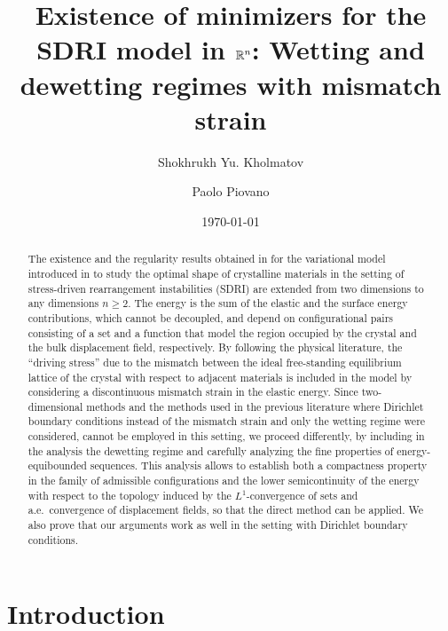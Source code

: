 \documentclass[reqno]{amsart}
\title[Existence for the SDRI model in $\R^n$]{Existence of minimizers for the SDRI model in $\R^n$: Wetting and dewetting regimes with mismatch strain}
\author[Sh. Kholmatov] {Shokhrukh Yu. Kholmatov}
\author[P. Piovano] {Paolo Piovano}
\date{\today}
\numberwithin{equation}{section}
\theoremstyle{plain}
\theoremstyle{definition}
\begin{document}
 
 

\begin{abstract} 
The existence and the regularity results obtained in  \cite{HP:2021_arxiv} for the variational model introduced in \cite{HP:2020_arma} to study the optimal shape of crystalline materials in the setting of stress-driven rearrangement instabilities (SDRI) are extended from two dimensions to any dimensions $n\geq2$. The energy is the sum of the elastic and the surface energy contributions, which cannot be decoupled, and depend on configurational pairs consisting of a set and a function that model the region occupied by the crystal and  the bulk displacement field, respectively. By following the physical  literature,  the  ``driving stress'' due to the mismatch  between the ideal free-standing equilibrium lattice of the crystal with respect to adjacent materials is included in the model by considering a discontinuous mismatch strain in the elastic energy. Since two-dimensional methods and the methods used in the previous literature where Dirichlet boundary conditions instead of the mismatch strain and only the wetting regime were considered, cannot be employed in this setting, we proceed differently, by including in the analysis the dewetting regime and carefully analyzing the fine properties of energy-equibounded sequences. This analysis allows to establish both a compactness property in the family of admissible configurations and the lower semicontinuity of the energy with respect to the topology induced by the $L^1$-convergence of sets and a.e.\ convergence of displacement fields, so that the direct method  can be applied. We also prove that our arguments work as well in the setting with Dirichlet boundary conditions.
\end{abstract}

\maketitle

\section{Introduction}
\end{document}
